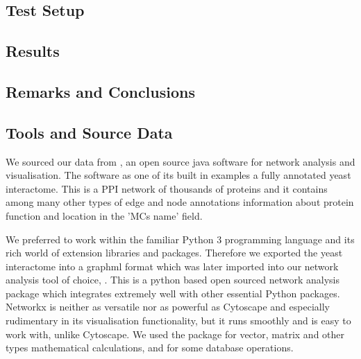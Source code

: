 
\subsection*{Test Setup}

\subsection*{Results}

\subsection*{Remarks and Conclusions}

%
%

\subsection{Tools and Source Data}

We sourced our data from \textcite{cytoscape}, an open source
java software for network analysis and visualisation. 
The software as one of its built in examples a
fully annotated yeast interactome. This is a PPI network of
thousands of proteins and it contains among many other types of
edge and node annotations information about protein function and
location in the 'MCs name' field.

We preferred to work within the familiar Python 3 programming
language and its rich world of extension libraries and packages.
Therefore we exported the yeast interactome into a graphml format
which was later imported into our network analysis tool of choice,
\textcite{networkx}. This is a python based open sourced network analysis 
package which integrates extremely well with other essential Python
packages. Networkx is neither as versatile nor as powerful as Cytoscape and
especially rudimentary in its visualisation functionality, but it
runs smoothly and is easy to work with, unlike Cytoscape.
We used the \textcite{numpy} package for vector, matrix and other
types mathematical
calculations, and \textcite{pandas} for some database operations. 

